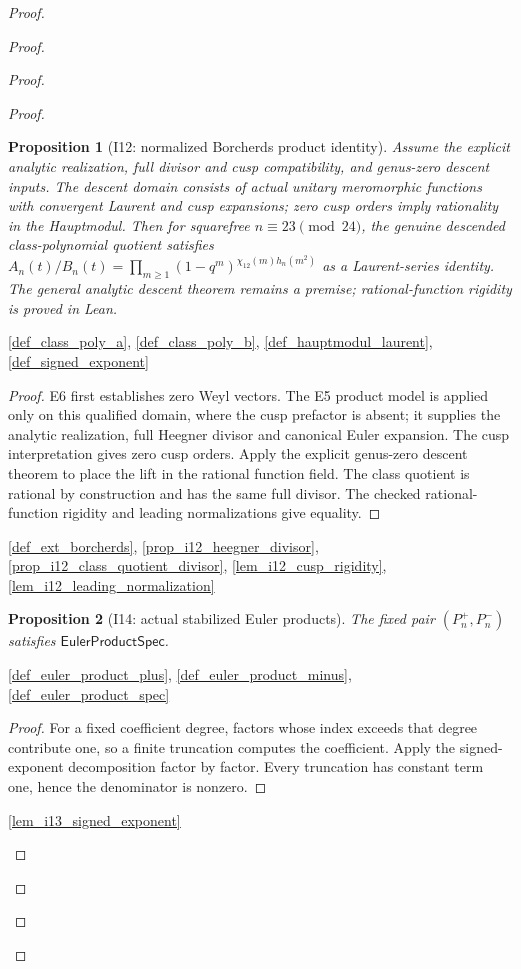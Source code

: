 \documentclass[11pt,a4paper]{article}
\numberwithin{equation}{section}
\theoremstyle{plain}\newtheorem{theorem}{Theorem}[section]\newaliascnt{proposition}{theorem}\newtheorem{proposition}[proposition]{Proposition}\aliascntresetthe{proposition}\newaliascnt{lemma}{theorem}\newtheorem{lemma}[lemma]{Lemma}\aliascntresetthe{lemma}
\theoremstyle{definition}\newaliascnt{definition}{theorem}\newtheorem{definition}[definition]{Definition}\aliascntresetthe{definition}\newaliascnt{notation}{theorem}\newtheorem{notation}[notation]{Notation}\aliascntresetthe{notation}
\providecommand{\lean}[1]{}\providecommand{\leanok}{}
\begin{document}
\begin{proof}
\begin{proof}
\begin{proof}
\begin{proof}
\begin{proposition}[I12: normalized Borcherds product identity]\label{prop_i12_product_identity}\lean{SptCM.Analytic.Repaired.actualClassPolynomialLaurentQuotient_eq_canonicalEulerQuotient}\leanok
Assume the explicit analytic realization, full divisor and cusp compatibility, and genus-zero descent inputs. The descent domain consists of actual unitary meromorphic functions with convergent Laurent and cusp expansions; zero cusp orders imply rationality in the Hauptmodul. Then for squarefree $n\equiv23\pmod{24}$, the genuine descended class-polynomial quotient satisfies $A_n(t)/B_n(t)=\prod_{m\ge1}(1-q^m)^{\chi_{12}(m)h_n(m^2)}$ as a Laurent-series identity. The general analytic descent theorem remains a premise; rational-function rigidity is proved in Lean.
\end{proposition}
\begin{uses-statement}\ref{def_class_poly_a}, \ref{def_class_poly_b}, \ref{def_hauptmodul_laurent}, \ref{def_signed_exponent}\end{uses-statement}
\begin{proof}E6 first establishes zero Weyl vectors. The E5 product model is applied only on this qualified domain, where the cusp prefactor is absent; it supplies the analytic realization, full Heegner divisor and canonical Euler expansion. The cusp interpretation gives zero cusp orders. Apply the explicit genus-zero descent theorem to place the lift in the rational function field. The class quotient is rational by construction and has the same full divisor. The checked rational-function rigidity and leading normalizations give equality.\end{proof}
\begin{uses-proof}\ref{def_ext_borcherds}, \ref{prop_i12_heegner_divisor}, \ref{prop_i12_class_quotient_divisor}, \ref{lem_i12_cusp_rigidity}, \ref{lem_i12_leading_normalization}\end{uses-proof}

\begin{proposition}[I14: actual stabilized Euler products]\label{prop_i14_euler_products}\lean{SptCM.Repair.eulerProducts_spec}\leanok
The fixed pair $(P_n^+,P_n^-)$ satisfies $\mathsf{EulerProductSpec}$.
\end{proposition}
\begin{uses-statement}\ref{def_euler_product_plus}, \ref{def_euler_product_minus}, \ref{def_euler_product_spec}\end{uses-statement}
\begin{proof}
For a fixed coefficient degree, factors whose index exceeds that degree contribute one, so a finite truncation computes the coefficient.  Apply the signed-exponent decomposition factor by factor.  Every truncation has constant term one, hence the denominator is nonzero.
\end{proof}
\begin{uses-proof}\ref{lem_i13_signed_exponent}\end{uses-proof}


\end{proof}
\end{proof}
\end{proof}
\end{proof}
\end{document}
